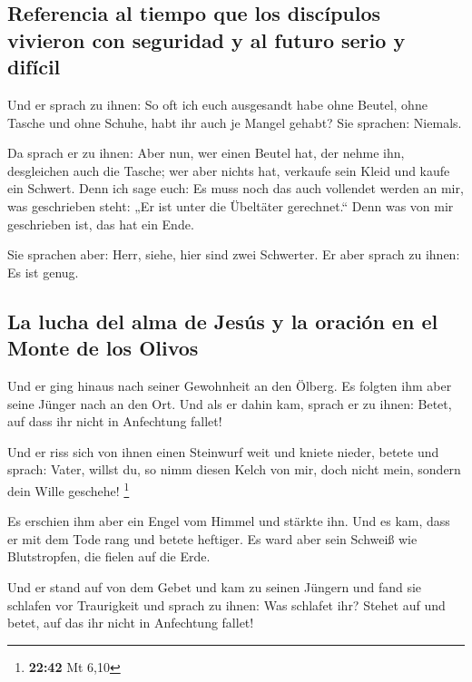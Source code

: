 \hypertarget{referencia-al-tiempo-que-los-discuxedpulos-vivieron-con-seguridad-y-al-futuro-serio-y-difuxedcil}{%
\subsection{Referencia al tiempo que los discípulos vivieron con
seguridad y al futuro serio y
difícil}\label{referencia-al-tiempo-que-los-discuxedpulos-vivieron-con-seguridad-y-al-futuro-serio-y-difuxedcil}}

 Und er sprach zu ihnen: So oft ich euch ausgesandt habe
ohne Beutel, ohne Tasche und ohne Schuhe, habt ihr auch je Mangel
gehabt? Sie sprachen: Niemals.

 Da sprach er zu ihnen: Aber nun, wer einen Beutel hat,
der nehme ihn, desgleichen auch die Tasche; wer aber nichts hat,
verkaufe sein Kleid und kaufe ein Schwert.  Denn ich sage
euch: Es muss noch das auch vollendet werden an mir, was geschrieben
steht: „Er ist unter die Übeltäter gerechnet.`` Denn was von mir
geschrieben ist, das hat ein Ende.

 Sie sprachen aber: Herr, siehe, hier sind zwei
Schwerter. Er aber sprach zu ihnen: Es ist genug.

\hypertarget{la-lucha-del-alma-de-jesuxfas-y-la-oraciuxf3n-en-el-monte-de-los-olivos}{%
\subsection{La lucha del alma de Jesús y la oración en el Monte de los
Olivos}\label{la-lucha-del-alma-de-jesuxfas-y-la-oraciuxf3n-en-el-monte-de-los-olivos}}

 Und er ging hinaus nach seiner Gewohnheit an den Ölberg.
Es folgten ihm aber seine Jünger nach an den Ort.  Und
als er dahin kam, sprach er zu ihnen: Betet, auf dass ihr nicht in
Anfechtung fallet!

 Und er riss sich von ihnen einen Steinwurf weit und
kniete nieder, betete  und sprach: Vater, willst du, so
nimm diesen Kelch von mir, doch nicht mein, sondern dein Wille geschehe!
\footnote{\textbf{22:42} Mt 6,10}

 Es erschien ihm aber ein Engel vom Himmel und stärkte
ihn.  Und es kam, dass er mit dem Tode rang und betete
heftiger. Es ward aber sein Schweiß wie Blutstropfen, die fielen auf die
Erde.

 Und er stand auf von dem Gebet und kam zu seinen Jüngern
und fand sie schlafen vor Traurigkeit  und sprach zu
ihnen: Was schlafet ihr? Stehet auf und betet, auf das ihr nicht in
Anfechtung fallet!

